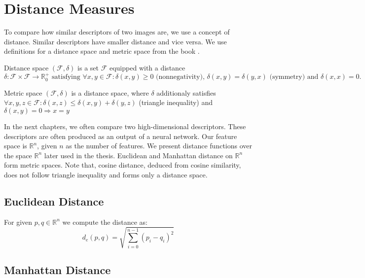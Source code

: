 \section{Distance Measures}
\label{s:distance_measures}

To compare how similar descriptors of two images are, we use a concept of distance. Similar descriptors have smaller distance and vice versa. We use definitions for a distance space and metric space from the book \cite{deza2009encyclopedia}.

\theoremstyle{definition}
\begin{definition}{Distance space}
$(\mathcal{F}, \delta )$ is a set $\mathcal{F}$ equipped
with a distance $\delta : \mathcal{F} \times \mathcal{F} \rightarrow \mathbb{R}^+_0 \text{ satisfying } \forall x, y \in \mathcal{F}: \delta(x, y) \geq 0 \text{ (nonnegativity), } \delta(x, y) = \delta(y, x) \text{ (symmetry) and } \delta(x, x) = 0.$
\end{definition}

\theoremstyle{definition}
\begin{definition}{Metric space}
$(\mathcal{F}, \delta)$ is a distance space, where $\delta$ additionaly satisfies $\forall x, y, z \in \mathcal{F} : \delta(x,z) \leq \delta(x,y) + \delta(y,z)$ (triangle inequality) and $\delta(x, y) = 0 \Rightarrow x = y$
\end{definition}

In the next chapters, we often compare two high-dimensional descriptors. These descriptors are often produced as an output of a neural network. Our feature space is $\mathbb{R}^n$, given $n$ as the number of features. We present distance functions over the space $\mathbb{R}^n$ later used in the thesis. Euclidean and Manhattan distance on $\mathbb{R}^n$ form metric spaces. Note that, cosine distance, deduced from cosine similarity, does not follow triangle inequality and forms only a distance space.

\subsection{Euclidean Distance}

For given $p, q \in \mathbb{R}^n$ we compute the distance as:
\begin{equation}
d_e({p},{q}) = \sqrt{\sum_{i=0}^{n-1} (p_i - q_i)^2}    
\end{equation}


\subsection{Manhattan Distance}

